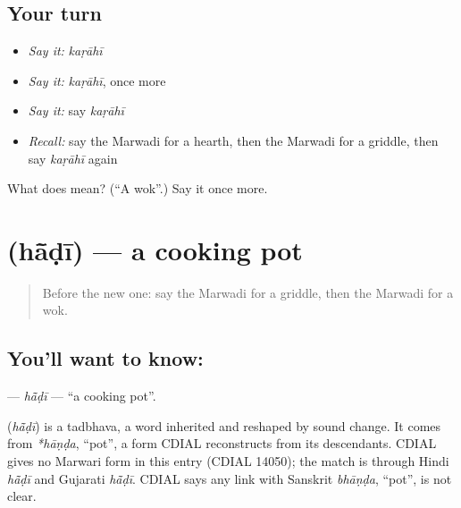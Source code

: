 \subsection*{Your turn}
\begin{itemize}
\raggedright
  \item \emph{Say it:} \emph{kaṛāhī}
  \item \emph{Say it:} \emph{kaṛāhī}, once more
  \item \emph{Say it:} say \emph{kaṛāhī}
  \item \emph{Recall:} say the Marwadi for a hearth, then the Marwadi for a griddle, then say \emph{kaṛāhī} again
\end{itemize}

\begin{tcolorbox}[breakable,colback=teal!4,colframe=teal!35!black,title={Before you move on}]
What does  mean? (\textquotedblleft{}A wok\textquotedblright{}.) Say it once more.
\end{tcolorbox}
\section[\texorpdfstring{\mw{हांडी} (hā̃ḍī)}{हांडी (hā̃ḍī)}]{ (hā̃ḍī) — a cooking pot}

\label{lesson:MW-C118-hadi}



\begin{quote}
Before the new one: say the Marwadi for a griddle, then the Marwadi for a wok.
\end{quote}

\subsection*{You'll want to know: }
\textbf{} — \emph{hā̃ḍī} — \textquotedblleft{}a cooking pot\textquotedblright{}.

\begin{cousinweb}
\textbf{} (\emph{hā̃ḍī}) is a tadbhava, a word inherited and reshaped by sound change. It comes from \emph{*hāṇḍa}, \textquotedblleft{}pot\textquotedblright{}, a form CDIAL reconstructs from its descendants. CDIAL gives no Marwari form in this entry (CDIAL 14050); the match is through Hindi \emph{hā̃ḍī} and Gujarati \emph{hā̃ḍī}. CDIAL says any link with Sanskrit \emph{bhāṇḍa}, \textquotedblleft{}pot\textquotedblright{}, is not clear.
\end{cousinweb}

